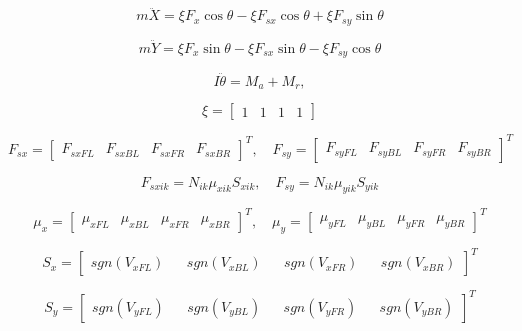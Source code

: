\begin{equation}
\label{eq:eromodelglobal1}
m\ddot{X} = \xi F_x\cos \theta -\xi F_{sx}\cos \theta + \xi F_{sy} \sin\theta
\end{equation}

\begin{equation}
\label{eq:eromodelglobal2}
m\ddot{Y} = \xi F_x\sin \theta -\xi F_{sx}\sin \theta - \xi F_{sy} \cos \theta
\end{equation}

\begin{equation}
\label{eq:eromodelglobal3}
I\ddot{\theta} = M_{a}+ M_{r},
\end{equation}

\begin{equation*}
\xi = \begin{bmatrix}
1 & 1 & 1 & 1
\end{bmatrix}
\end{equation*}

\begin{equation*}
F_{sx} = \begin{bmatrix}
F_{sxFL} & F_{sxBL} & F_{sxFR} & F_{sxBR}
\end{bmatrix}^T
, \quad
F_{sy} = \begin{bmatrix}
F_{syFL} & F_{syBL} & F_{syFR} & F_{syBR}
\end{bmatrix}^T
\end{equation*}

\begin{equation*}
    F_{sxik}=N_{ik} \mu_{xik} S_{xik}
    ,\quad
    F_{sy}=N_{ik} \mu_{yik} S_{y{ik}}
\end{equation*}

\begin{equation*}
\mu _x = \begin{bmatrix}
\mu _{xFL} & 
\mu _{xBL} & 
\mu _{xFR} & 
\mu _{xBR}
\end{bmatrix}^T
,\quad
\mu _y = \begin{bmatrix}
\mu _{yFL}& 
\mu _{yBL}& 
\mu _{yFR}&
\mu _{yBR}
\end{bmatrix}^T
\end{equation*}

\begin{equation*}
S_x=\begin{bmatrix}
sgn(V_{xFL})&& 
sgn(V_{xBL})&& 
sgn(V_{xFR})&& 
sgn(V_{xBR})
\end{bmatrix}^T
\end{equation*}

\begin{equation*}
S_y=\begin{bmatrix}
sgn(V_{yFL})&& 
sgn(V_{yBL})&& 
sgn(V_{yFR})&& 
sgn(V_{yBR})
\end{bmatrix}^T
\end{equation*}

